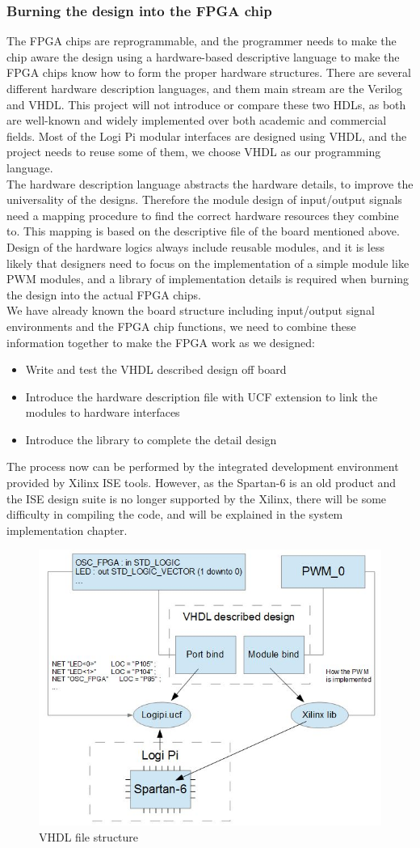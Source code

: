 \documentclass[11pt,openright,a4paper]{report}
\begin{document}
\subsubsection{Burning the design into the FPGA chip}
The FPGA chips are reprogrammable, and the programmer needs to make the chip aware the design using a hardware-based descriptive language to make the FPGA chips know how to form the proper hardware structures. There are several different hardware description languages, and them main stream are the Verilog and VHDL. This project will not introduce or compare these two HDLs, as both are well-known and widely implemented over both academic and commercial fields. Most of the Logi Pi modular interfaces are designed using VHDL, and the project needs to reuse some of them, we choose VHDL as our programming language.\\
The hardware description language abstracts the hardware details, to improve the universality of the designs. Therefore the module design of input/output signals need a mapping procedure to find the correct hardware resources they combine to. This mapping is based on the descriptive file of the board mentioned above.\\
Design of the hardware logics always include reusable modules, and it is less likely that designers need to focus on the implementation of a simple module like PWM modules, and a library of implementation details is required when burning the design into the actual FPGA chips.\\
We have already known the board structure including input/output signal environments and the FPGA chip functions, we need to combine these information together to make the FPGA work as we designed:
\begin{itemize}
	\item Write and test the VHDL described design off board
	\item Introduce the hardware description file with UCF extension to link the modules to hardware interfaces
	\item Introduce the library to complete the detail design
\end{itemize}
The process now can be performed by the integrated development environment provided by Xilinx ISE tools. However, as the Spartan-6 is an old product and the ISE design suite is no longer supported by the Xilinx, there will be some difficulty in compiling the code, and will be explained in the system implementation chapter.\\
\begin{figure}[H]
\centering
\includegraphics[width=0.5\linewidth]{picture/vhdlstruct}
\caption{VHDL file structure}
\label{fig:vhdlstruct}
\end{figure}
\end{document}

